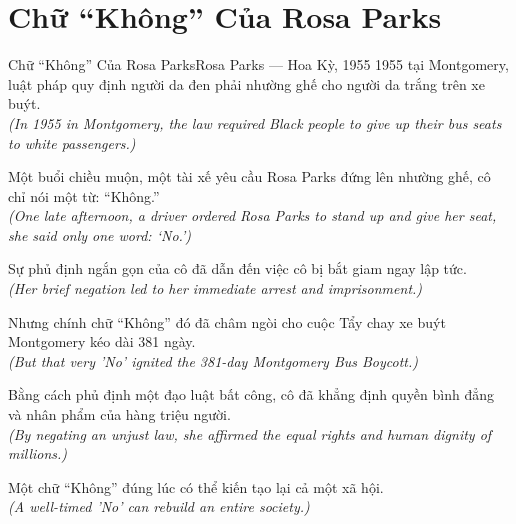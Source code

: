\section{Chữ ``Không'' Của Rosa Parks}
\begin{truyen}{Chữ ``Không'' Của Rosa Parks}{Rosa Parks --- Hoa Kỳ, 1955}
 1955 tại Montgomery, luật pháp quy định người da đen phải nhường ghế cho người da trắng trên xe buýt.\\[4pt]
\textit{(In 1955 in Montgomery, the law required Black people to give up their bus seats to white passengers.)}

Một buổi chiều muộn, một tài xế yêu cầu Rosa Parks đứng lên nhường ghế, cô chỉ nói một từ: ``Không.''\\[4pt]
\textit{(One late afternoon, a driver ordered Rosa Parks to stand up and give her seat, she said only one word: `No.')}

Sự phủ định ngắn gọn của cô đã dẫn đến việc cô bị bắt giam ngay lập tức.\\[4pt]
\textit{(Her brief negation led to her immediate arrest and imprisonment.)}

Nhưng chính chữ ``Không'' đó đã châm ngòi cho cuộc Tẩy chay xe buýt Montgomery kéo dài 381 ngày.\\[4pt]
\textit{(But that very 'No' ignited the 381-day Montgomery Bus Boycott.)}

Bằng cách phủ định một đạo luật bất công, cô đã khẳng định quyền bình đẳng và nhân phẩm của hàng triệu người.\\[4pt]
\textit{(By negating an unjust law, she affirmed the equal rights and human dignity of millions.)}

\end{truyen}
\begin{baihoc}
  Một chữ ``Không'' đúng lúc có thể kiến tạo lại cả một xã hội.\\[4pt]
  \textit{(A well-timed 'No' can rebuild an entire society.)}
\end{baihoc}

